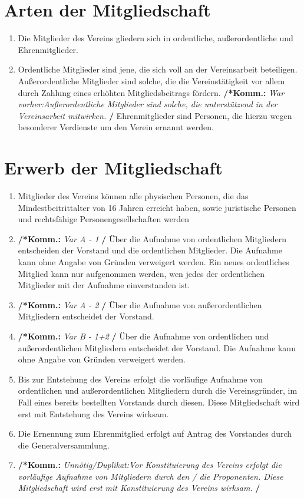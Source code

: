 \documentclass[a4paper,12pt]{article}
\newcommand{\comment}[1]{{\bf /*Komm.:} \textit{#1} {\bf */}}
\begin{document}
\section{Arten der Mitgliedschaft} %
\label{sec:Mitgliedschaft-Arten}
\begin{enumerate}
\item Die Mitglieder des Vereins gliedern sich in ordentliche, außerordentliche und Ehrenmitglieder.

\item Ordentliche Mitglieder sind jene, die sich voll an der Vereinsarbeit beteiligen.
Außerordentliche Mitglieder sind solche, die die Vereinstätigkeit vor allem durch Zahlung eines erhöhten Mitgliedsbeitrags fördern.
\comment{War vorher:Außerordentliche Mitglieder sind solche, die unterstützend in der Vereinsarbeit mitwirken.}
Ehrenmitglieder sind Personen, die hierzu wegen besonderer Verdienste um den Verein ernannt werden.
\end{enumerate}

\section{Erwerb der Mitgliedschaft} %
\begin{enumerate}
\item Mitglieder des Vereins können alle physischen Personen, die das Mindestbeitrittalter von 16 Jahren erreicht haben, sowie juristische Personen und rechtsfähige Personengesellschaften werden

\item \comment{Var A - 1} Über die Aufnahme von ordentlichen Mitgliedern entscheiden der Vorstand und die ordentlichen Mitglieder. Die Aufnahme kann ohne Angabe von Gründen verweigert werden.
Ein neues ordentliches Mitglied kann nur aufgenommen werden, wen jedes der ordentlichen Mitglieder mit der Aufnahme einverstanden ist.

\item \comment{Var A - 2} Über die Aufnahme von außerordentlichen Mitgliedern entscheidet der Vorstand.

\item \comment{Var B - 1+2} Über die Aufnahme von ordentlichen und außerordentlichen Mitgliedern entscheidet der Vorstand. Die Aufnahme kann ohne Angabe von Gründen verweigert werden.
	
\item Bis zur Entstehung des Vereins erfolgt die vorläufige Aufnahme von ordentlichen und außerordentlichen Mitgliedern durch die Vereinsgründer, im Fall eines bereits bestellten Vorstands durch diesen. Diese Mitgliedschaft wird erst mit Entstehung des Vereins wirksam.

\item  Die Ernennung zum Ehrenmitglied erfolgt auf Antrag des Vorstandes durch die Generalversammlung.

\item \comment{Unnötig/Duplikat:Vor Konstituierung des Vereins erfolgt die vorläufige Aufnahme von Mitgliedern durch den / die Proponenten. Diese Mitgliedschaft wird erst mit Konstituierung des Vereins wirksam.}

\end{enumerate}
\end{document}
